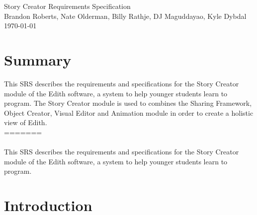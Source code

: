 \documentclass[12pt]{article}
\begin{document}

\begin{titlepage}
	\vspace*{\fill} %
	\begin{center}
		{\Huge Story Creator Requirements Specification}\\ [0.5cm]	%
		{\Large Brandon Roberts, Nate Olderman, Billy Rathje, DJ Maguddayao, Kyle Dybdal}\\[0.4cm]
		\today %
	\end{center}
	\vspace*{\fill}
\end{titlepage}

\section{Summary}
This SRS describes the requirements and specifications for the Story Creator module of the Edith software, a system to help younger students learn to program. The Story Creator module is used to combines the Sharing Framework, Object Creator, Visual Editor and Animation module in order to create a holistic view of Edith.  \\

======= \\ \\
This SRS describes the requirements and specifications for the Story Creator module of the Edith software, a system to help younger students learn to program.


\section{Introduction}%
\end{document}

